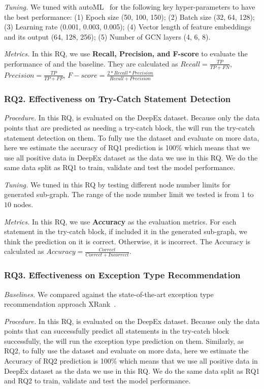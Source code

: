 {\em Tuning.} We tuned {\tool} with autoML~\cite{NNI} for the following key hyper-parameters to have the best performance: (1) Epoch size (50, 100, 150); (2) Batch size (32, 64, 128); (3) Learning rate (0.001, 0.003, 0.005); (4) Vector length of feature embeddings and its output (64, 128, 256); (5) Number of GCN layers (4, 6, 8).

{\em Metrics.} In this RQ, we use \textbf{Recall, Precision, and F-score} to evaluate the performance of \tool and the baseline. They are calculated as $Recall = \frac{TP}{TP+FN}$, $Precision = \frac{TP}{TP+FP}$, $F-score = \frac{2*Recall*Precision}{Recall+Precision}$

\subsubsection{RQ2. Effectiveness on Try-Catch Statement Detection}

{\em Procedure.} In this RQ, \tool is evaluated on the DeepEx dataset. Because only the data points that are predicted as needing a try-catch block, the \tool will run the try-catch statement detection on them. To fully use the dataset and evaluate \tool on more data, here we estimate the accuracy of RQ1 prediction is 100\% which means that we use all positive data in DeepEx dataset as the data we use in this RQ. We do the same data split as RQ1 to train, validate and test the model performance.

{\em Tuning.} We tuned {\tool} in this RQ by testing different node number limits for generated sub-graph. The range of the node number limit we tested is from $1$ to $10$ nodes.

{\em Metrics.} In this RQ, we use \textbf{Accuracy} as the evaluation metrics. For each statement in the try-catch block, if \tool included it in the generated sub-graph, we think the prediction on it is correct. Otherwise, it is incorrect. The Accuracy is calculated as $Accuracy = \frac{Correct}{Correct + Incorrect}$.

\subsubsection{RQ3. Effectiveness on Exception Type Recommendation}

{\em Baselines.} We compared {\tool} against the state-of-the-art exception type recommendation approach XRank~\cite{nguyen2020code}.

{\em Procedure.} In this RQ, \tool is evaluated on the DeepEx dataset. Because only the data points that \tool can successfully predict all statements in the try-catch block successfully, the \tool will run the exception type prediction on them. Similarly, as RQ2, to fully use the dataset and evaluate \tool on more data, here we estimate the Accuracy of RQ2 prediction is 100\% which means that we use all positive data in DeepEx dataset as the data we use in this RQ. We do the same data split as RQ1 and RQ2 to train, validate and test the model performance.

